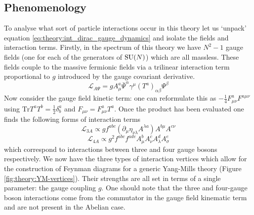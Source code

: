 \subsection{Phenomenology}
To analyse what sort of particle interactions occur in this theory let us `unpack' equation \ref{eq:theory:int_dirac_gauge_dynamics} and isolate the fields and interaction terms. 
Firstly, in the spectrum of this theory we have $N^{2}-1$ gauge fields (one for each of the generators of ${\mathrm{SU}(N)}$) which are all massless. 
These fields couple to the massive fermionic fields via a trilinear interaction term proportional to $g$ introduced by the gauge covariant derivative.
\begin{equation}
    \mathcal{L}_{{A}\Psi} = gA_{\mu}^{a}\bar{\Psi}^{\alpha}\gamma^{\mu}(T^{a})_{\alpha\beta}\Psi^{\beta}
\end{equation}
Now consider the gauge field kinetic term: one can reformulate this as $-\frac{1}{4}F^{a}_{\mu\nu}F^{a\mu\nu}$ using $\mathrm{Tr}T^{a}T^{b} = \frac{1}{2}\delta^{a}_{b}$ and $F_{\mu\nu} = F^{a}_{\mu\nu}T^{a}$. 
Once the product has been evaluated one finds the following forms of interaction terms
\begin{equation}
    \mathcal{L}_{3A} \propto gf^{abc}(\partial_{\mu}\eta_{\nu\lambda}A^{\lambda{a}})A^{b\mu}A^{c\nu} 
\end{equation}
%
\begin{equation}
    \mathcal{L}_{4A} \propto g^{2}f^{abc}f^{ade}A_{\mu}^{b}A_{\nu}^{c}A_{\lambda}^{d}A_{\sigma}^{e}
\end{equation}
%
which correspond to interactions between three and four gauge bosons respectively. 
We now have the three types of interaction vertices which allow for the construction of Feynman diagrams for a generic Yang-Mills theory (Figure \ref{fig:theory:YM-vertices}). 
Their strengths are all set in terms of a single parameter: the gauge coupling $g$.
One should note that the three and four-gauge boson interactions come from the commutator in the gauge field kinematic term and are not present in the Abelian case. 




